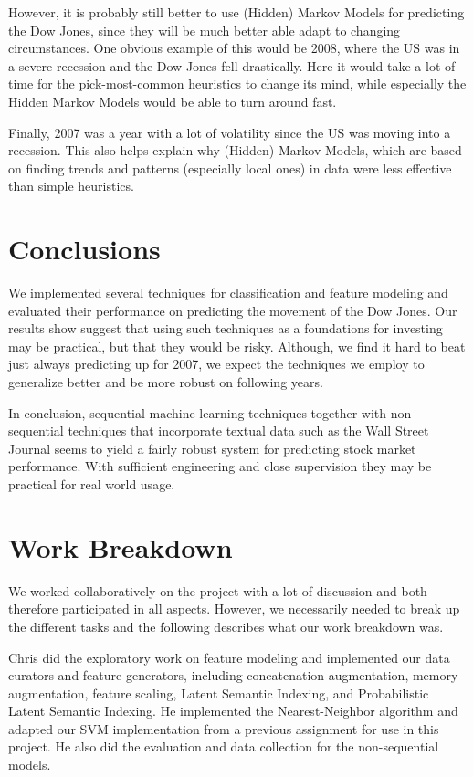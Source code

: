 \documentclass[10pt, twocolumn]{article}
\begin{document}
However, it is probably still better to use (Hidden) Markov Models for predicting the Dow Jones, since they will be much better able adapt to changing circumstances.
One obvious example of this would be 2008, where the US was in a severe recession and the Dow Jones fell drastically.
Here it would take a lot of time for the pick-most-common heuristics to change its mind, while especially the Hidden Markov Models would be able to turn around fast.

Finally, 2007 was a year with a lot of volatility since the US was moving into a recession.
This also helps explain why (Hidden) Markov Models, which are based on finding trends and patterns (especially local ones) in data were less effective than simple heuristics.

\section{Conclusions}
We implemented several techniques for classification and feature modeling and evaluated their performance on predicting the movement of the Dow Jones.
Our results show suggest that using such techniques as a foundations for investing may be practical, but that they would be risky.
Although, we find it hard to beat just always predicting up for 2007, we expect the techniques we employ to generalize better and be more robust on following years. 

In conclusion,  sequential machine learning techniques together with non-sequential techniques that incorporate textual data such as the Wall Street Journal seems to yield a fairly robust system for predicting stock market performance. With sufficient engineering and close supervision they may be practical for real world usage.

\appendix

\section{Work Breakdown}
We worked collaboratively on the project with a lot of discussion and both therefore participated in all aspects.
However, we necessarily needed to break up the different tasks and the following describes what our work breakdown was.

Chris did the exploratory work on feature modeling and implemented our data curators and feature generators, including concatenation augmentation, memory augmentation, feature scaling, Latent Semantic Indexing, and Probabilistic Latent Semantic Indexing. He implemented the Nearest-Neighbor algorithm and adapted our SVM implementation from a previous assignment for use in this project. He also did the evaluation and data collection for the non-sequential models. 
\end{document}
